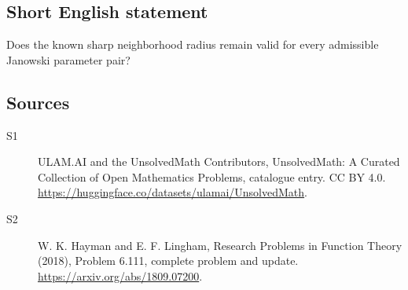 \documentclass[11pt]{article}
\begin{document}
\subsection{Short English statement}
Does the known sharp neighborhood radius remain valid for every admissible Janowski parameter pair?
\subsection{Sources}
\begin{description}
\item[\hypertarget{source:statement:1}{S1}] ULAM.AI and the UnsolvedMath Contributors, UnsolvedMath: A Curated Collection of Open Mathematics Problems, catalogue entry. CC BY 4.0. \url{https://huggingface.co/datasets/ulamai/UnsolvedMath}.
\item[\hypertarget{source:statement:2}{S2}] W. K. Hayman and E. F. Lingham, Research Problems in Function Theory (2018), Problem 6.111, complete problem and update. \url{https://arxiv.org/abs/1809.07200}.
\end{description}
\label{end:statement}
\end{document}
